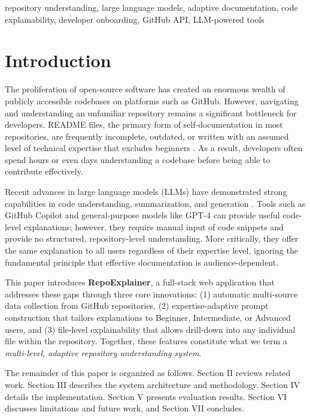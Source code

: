 \documentclass[conference]{IEEEtran}
\begin{document}
\begin{IEEEkeywords}
repository understanding, large language models, adaptive documentation, code explainability, developer onboarding, GitHub API, LLM-powered tools
\end{IEEEkeywords}

\section{Introduction}

The proliferation of open-source software has created an enormous wealth of publicly accessible codebases on platforms such as GitHub. However, navigating and understanding an unfamiliar repository remains a significant bottleneck for developers. README files, the primary form of self-documentation in most repositories, are frequently incomplete, outdated, or written with an assumed level of technical expertise that excludes beginners \cite{b1}. As a result, developers often spend hours or even days understanding a codebase before being able to contribute effectively.

Recent advances in large language models (LLMs) have demonstrated strong capabilities in code understanding, summarization, and generation \cite{b2}. Tools such as GitHub Copilot and general-purpose models like GPT-4 can provide useful code-level explanations; however, they require manual input of code snippets and provide no structured, repository-level understanding. More critically, they offer the same explanation to all users regardless of their expertise level, ignoring the fundamental principle that effective documentation is audience-dependent.

This paper introduces \textbf{RepoExplainer}, a full-stack web application that addresses these gaps through three core innovations: (1) automatic multi-source data collection from GitHub repositories, (2) expertise-adaptive prompt construction that tailors explanations to Beginner, Intermediate, or Advanced users, and (3) file-level explainability that allows drill-down into any individual file within the repository. Together, these features constitute what we term a \textit{multi-level, adaptive repository understanding system}.

The remainder of this paper is organized as follows. Section II reviews related work. Section III describes the system architecture and methodology. Section IV details the implementation. Section V presents evaluation results. Section VI discusses limitations and future work, and Section VII concludes.
\end{document}

